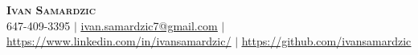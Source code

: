 \begin{center}
	\textbf{\Huge \scshape Ivan Samardzic} \\ \vspace{1pt}
	\small 647-409-3395 $|$
    \href{mailto:ivan.samardzic7@gmail.com}{\underline{ivan.samardzic7@gmail.com}} $|$
	\href{https://www.linkedin.com/in/ivansamardzic/}{\underline{https://www.linkedin.com/in/ivansamardzic/}} $|$
	\href{https://github.com/ivansamardzic}{\underline{https://github.com/ivansamardzic}}
\end{center}
